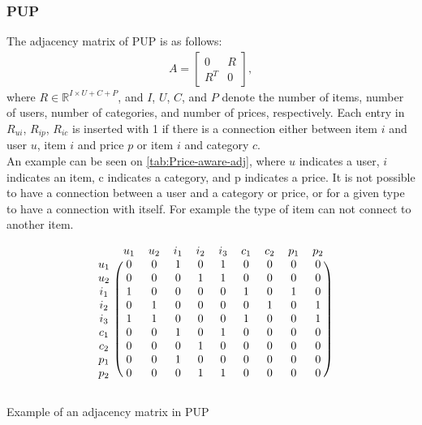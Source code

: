 \subsubsection{PUP}
The adjacency matrix of PUP is as follows:
\begin{gather}
    A =
    \begin{bmatrix}
        0   & R \\
        R^T & 0
    \end{bmatrix},
\end{gather}
where $R \in \mathbb{R}^{I \times U+C+P}$, and $I$, $U$, $C$, and $P$ denote the number of items, number of users, number of categories, and number of prices, respectively.
Each entry in $R_{ui}$, $R_{ip}$, $R_{ic}$ is inserted with 1 if there is a connection either between item $i$ and user $u$, item $i$ and price $p$ or item $i$ and category $c$.\\
An example can be seen on \autoref{tab:Price-aware-adj}, where $u$ indicates a user, $i$ indicates an item, c indicates a category, and p indicates a price.
It is not possible to have a connection between a user and a category or price, or for a given type to have a connection with itself.
For example the type of item can not connect to another item.
\begin{table}
    \[
        \begin{blockarray}{cccccccccc}
            & u_1 & u_2 & i_1 & i_2 & i_3 & c_1 & c_2 & p_1 & p_2 \\
            \begin{block}{c(ccccccccc)}
                u_1 & 0 & 0 & 1 & 0 & 1 & 0 & 0 & 0 & 0   \\
                u_2 & 0 & 0 & 0 & 1 & 1 & 0 & 0 & 0 & 0  \\
                i_1 & 1 & 0 & 0 & 0 & 0 & 1 & 0 & 1 & 0  \\
                i_2 & 0 & 1 & 0 & 0 & 0 & 0 & 1 & 0 & 1  \\
                i_3 & 1 & 1 & 0 & 0 & 0 & 1 & 0 & 0 & 1  \\
                c_1 & 0 & 0 & 1 & 0 & 1 & 0 & 0 & 0 & 0  \\
                c_2 & 0 & 0 & 0 & 1 & 0 & 0 & 0 & 0 & 0  \\
                p_1 & 0 & 0 & 1 & 0 & 0 & 0 & 0 & 0 & 0  \\
                p_2 & 0 & 0 & 0 & 1 & 1 & 0 & 0 & 0 & 0  \\
            \end{block}
        \end{blockarray}
    \]
    \caption{Example of an adjacency matrix in PUP}
    \label{tab:Price-aware-adj}
\end{table}
